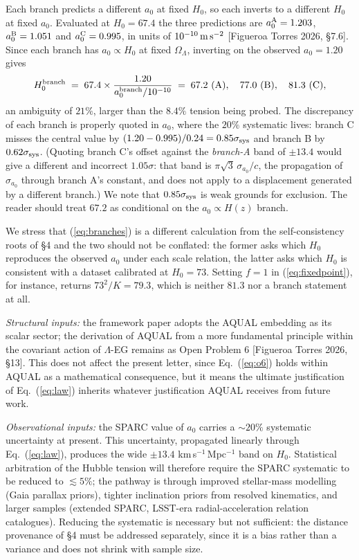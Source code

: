\documentclass[11pt,a4paper]{article}
\begin{document}
Each branch predicts a different $a_0$ at fixed $H_0$, so each inverts to a
different $H_0$ at fixed $a_0$. Evaluated at $H_0 = 67.4$ the three
predictions are $a_0^{\rm A} = 1.203$, $a_0^{\rm B} = 1.051$ and
$a_0^{\rm C} = 0.995$, in units of $10^{-10}\,\rm m\,s^{-2}$ [Figueroa
Torres 2026, \S7.6]. Since each branch has $a_0 \propto H_0$ at fixed
$\Omega_\Lambda$, inverting on the observed $a_0 = 1.20$ gives
\begin{equation}
H_0^{\rm branch} \;=\; 67.4 \times \frac{1.20}{a_0^{\rm branch}/10^{-10}}
\;=\; 67.2\ (\text{A}), \quad 77.0\ (\text{B}), \quad 81.3\ (\text{C}),
\label{eq:branches}
\end{equation}
an ambiguity of $21\%$, larger than the $8.4\%$ tension being probed. The
discrepancy of each branch is properly quoted in $a_0$, where the $20\%$
systematic lives: branch C misses the central value by
$(1.20-0.995)/0.24 = 0.85\sigma_{\rm sys}$ and branch B by
$0.62\sigma_{\rm sys}$. (Quoting branch C's offset against the
\emph{branch-A} band of $\pm 13.4$ would give a different and incorrect
$1.05\sigma$: that band is $\pi\sqrt{3}\,\sigma_{a_0}/c$, the propagation of
$\sigma_{a_0}$ through branch A's constant, and does not apply to a
displacement generated by a different branch.) We note that
$0.85\sigma_{\rm sys}$ is weak grounds for exclusion. The reader should
treat $67.2$ as conditional on the $a_0 \propto H(z)$ branch.

We stress that (\ref{eq:branches}) is a different calculation from the
self-consistency roots of \S4 and the two should not be conflated: the
former asks which $H_0$ reproduces the observed $a_0$ under each scale
relation, the latter asks which $H_0$ is consistent with a dataset
calibrated at $H_0 = 73$. Setting $f = 1$ in (\ref{eq:fixedpoint}), for
instance, returns $73^2/K = 79.3$, which is neither $81.3$ nor a branch
statement at all.

\emph{Structural inputs:} the framework paper adopts the AQUAL embedding
as its scalar sector; the derivation of AQUAL from a more fundamental
principle within the covariant action of $\Lambda$-EG remains as Open
Problem 6 [Figueroa Torres 2026, \S13]. This does not affect the present
letter, since Eq.~(\ref{eq:o6}) holds within AQUAL as a mathematical
consequence, but it means the ultimate justification of Eq.~(\ref{eq:law})
inherits whatever justification AQUAL receives from future work.

\emph{Observational inputs:} the SPARC value of $a_0$ carries a $\sim 20\%$
systematic uncertainty at present. This uncertainty, propagated linearly
through Eq.~(\ref{eq:law}), produces the wide $\pm 13.4$ km\,s$^{-1}$\,Mpc$^{-1}$
band on $H_0$. Statistical arbitration of the Hubble tension will therefore
require the SPARC systematic to be reduced to $\lesssim 5\%$; the pathway is
through improved stellar-mass modelling (Gaia parallax priors), tighter
inclination priors from resolved kinematics, and larger samples (extended
SPARC, LSST-era radial-acceleration relation catalogues). Reducing the
systematic is necessary but not sufficient: the distance provenance of \S4
must be addressed separately, since it is a bias rather than a variance and
does not shrink with sample size.
\end{document}
